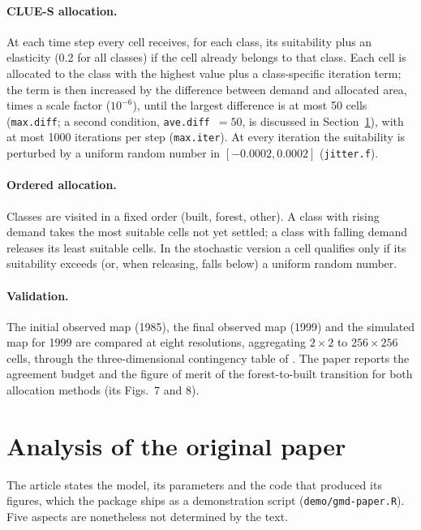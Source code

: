 \paragraph{CLUE-S allocation.} At each time step every cell receives, for each class,
its suitability plus an elasticity (0.2 for all classes) if the cell already belongs to
that class. Each cell is allocated to the class with the highest value plus a
class-specific iteration term; the term is then increased by the difference between
demand and allocated area, times a scale factor ($10^{-6}$), until the largest difference is at most 50 cells (\texttt{max.diff}; a second condition,
\texttt{ave.diff}~$= 50$, is discussed in Section~\ref{sec:analysis}), with at most 1000
iterations per step (\texttt{max.iter}). At every iteration the suitability is perturbed
by a uniform random number in $[-0.0002, 0.0002]$ (\texttt{jitter.f}).

\paragraph{Ordered allocation.} Classes are visited in a fixed order (built, forest,
other). A class with rising demand takes the most suitable cells not yet settled; a
class with falling demand releases its least suitable cells. In the stochastic
version a cell qualifies only if its suitability exceeds (or, when releasing, falls
below) a uniform random number.

\paragraph{Validation.} The initial observed map (1985), the final observed map (1999)
and the simulated map for 1999 are compared at eight resolutions, aggregating
$2 \times 2$ to $256 \times 256$ cells, through the three-dimensional contingency table
of \citet{Pontius:2011}. The paper reports the agreement budget and the figure of merit
of the forest-to-built transition for both allocation methods (its Figs.~7 and 8).

\section{Analysis of the original paper}
\label{sec:analysis}

The article states the model, its parameters and the code that produced its figures,
which the package ships as a demonstration script (\texttt{demo/gmd-paper.R}). Five aspects are nonetheless not determined by the text.

